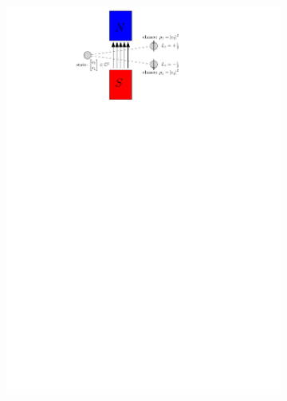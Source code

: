 \documentclass[12pt,final,3p]{elsarticle}
\begin{document}
\begin{figure}[h]
	\begin{subfigure}{0.48\textwidth}
		\centering
		\includegraphics[width=\textwidth, keepaspectratio]{figures/spin_anim_06.pdf}
		\label{fig:spin12}
	\end{subfigure}
	\begin{subfigure}{0.48\textwidth}
		\centering

\end{subfigure}
\end{figure}
\end{document}
